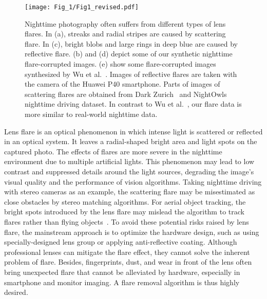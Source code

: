 \documentclass{article}
\newcommand{\yuekun}[1]{{\color{black}{#1}}}
\begin{document}
\begin{figure}
	\centering
\texttt{[image: Fig\_1/Fig1\_revised.pdf]}
\vspace{-2.5mm}
\caption{Nighttime photography often suffers from different types of lens flares. In (a), streaks and radial stripes are caused by scattering flare. In (c), bright blobs and large rings in deep blue are caused by reflective flare. (b) and (d) depict some of our synthetic nighttime flare-corrupted images. (e) show some flare-corrupted images synthesized by Wu et al.~\cite{how_to}. Images of reflective flares are taken with the \yuekun{rear} camera of the Huawei P40 smartphone. Parts of images of scattering flares are obtained from Dark Zurich~\cite{darkzurich} and NightOwls~\cite{nightowls} nighttime driving dataset. In contrast to Wu et al.~\cite{how_to}, our flare data is more similar to real-world nighttime data.} \vspace{-4mm}
	\label{fig:flare_sample}	
\end{figure}

Lens flare is an optical phenomenon in which intense light is scattered or reflected in an optical system.
It leaves a radial-shaped bright area and light spots on the captured photo. 
The effects of flares are more severe in the nighttime environment due to multiple artificial lights. 
This phenomenon may lead to low contrast and suppressed details around the light sources, degrading the image's visual quality and the performance of vision algorithms. 
Taking nighttime driving with stereo cameras as an example, the scattering flare may be misestimated as close obstacles by stereo matching algorithms. 
For aerial object tracking, the bright spots introduced by the lens flare may mislead the algorithm to track flares rather than flying objects~\cite{aerial_tracking}. 
To avoid these potential risks raised by lens flare, the mainstream approach is to optimize the hardware design, such as using specially-designed lens group or applying anti-reflective coating. 
Although professional lenses can mitigate the flare effect, they cannot solve the inherent problem of flare. 
Besides, fingerprints, dust, and wear in front of the lens often bring unexpected flare that cannot be alleviated by hardware, especially in smartphone and monitor imaging. 
A flare removal algorithm is thus highly desired.
\end{document}
